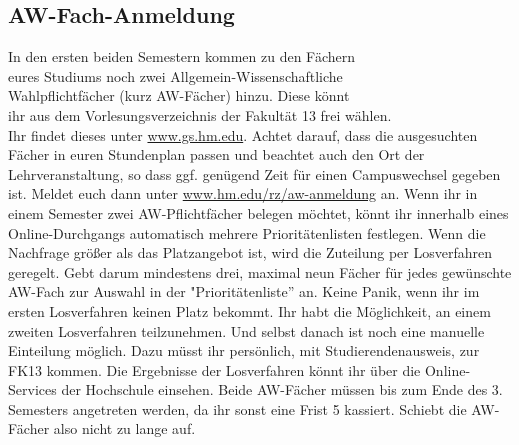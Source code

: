 \subsection{AW-Fach-Anmeldung}
In den ersten beiden Semestern kommen zu den Fächern\\ 
eures Studiums noch zwei Allgemein-Wissenschaftliche\\
 Wahlpflichtfächer (kurz AW-Fächer) hinzu. Diese könnt\\
  ihr aus dem Vorlesungsverzeichnis der Fakultät 13 frei wählen.\\
   Ihr findet dieses unter \url{www.gs.hm.edu}. Achtet darauf, dass die ausgesuchten Fächer in euren Stundenplan passen und beachtet auch den Ort der Lehrveranstaltung, so dass ggf. genügend Zeit für einen Campuswechsel gegeben ist. Meldet euch dann unter \url{www.hm.edu/rz/aw-anmeldung} an. Wenn ihr in einem Semester zwei AW-Pflichtfächer belegen möchtet, könnt ihr innerhalb eines Online-Durchgangs automatisch mehrere Prioritätenlisten festlegen. Wenn die Nachfrage größer als das Platzangebot ist, wird die Zuteilung per Losverfahren geregelt. Gebt darum mindestens drei, maximal neun Fächer für jedes gewünschte AW-Fach zur Auswahl in der "Prioritätenliste'' an. Keine Panik, wenn ihr im ersten Losverfahren keinen Platz bekommt. Ihr habt die Möglichkeit, an einem zweiten Losverfahren teilzunehmen. Und selbst danach ist noch eine manuelle Einteilung möglich. Dazu müsst ihr persönlich, mit Studierendenausweis, zur FK13 kommen. Die Ergebnisse der Losverfahren könnt ihr über die Online-Services der Hochschule einsehen. Beide AW-Fächer müssen bis zum Ende des 3. Semesters angetreten werden, da ihr sonst eine Frist 5 kassiert. Schiebt die AW-Fächer also nicht zu lange auf. 